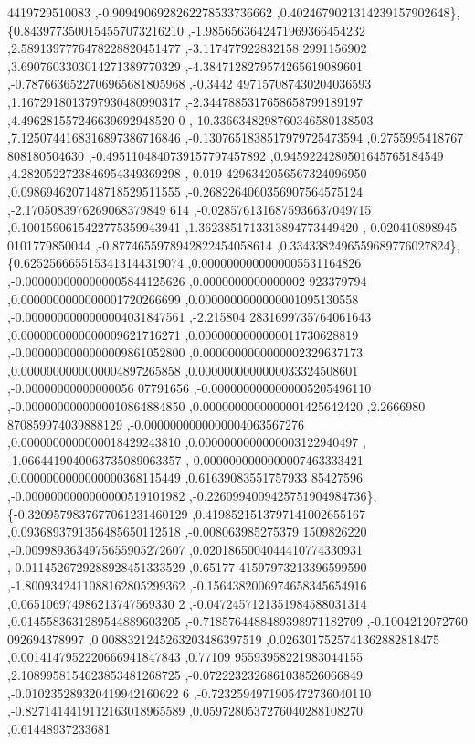 \begin{DoxyCode}
      4419729510083 ,-0.9094906928262278533736662 ,0.4024679021314239157902648\},
\{0.8439773500154557073216210 ,-1.9856563642471969366454232 ,2.5891397776478228820451477 ,-3.117477922832158
      2991156902 ,3.6907603303014271389770329 ,-4.3847128279574265619089601 ,-0.7876636522706965681805968 ,-0.3442
      497157087430204036593 ,1.1672918013797930480990317 ,-2.3447885317658658799189197 ,4.496281557246639692948520
      0 ,-10.3366348298760346580138503 ,7.1250744168316897386716846 ,-0.1307651838517979725473594 ,0.2755995418767
      808180504630 ,-0.4951104840739157797457892 ,0.9459224280501645765184549 ,4.2820522723846954349369298 ,-0.019
      4296342056567324096950 ,0.0986946207148718529511555 ,-0.2682264060356907564575124 ,-2.1705083976269068379849
      614 ,-0.0285761316875936637049715 ,0.1001590615422775359943941 ,1.3623851713313894773449420 ,-0.020410898945
      0101779850044 ,-0.8774655978942822454058614 ,0.3343382496559689776027824\},
\{0.6252566655153413144319074 ,0.0000000000000005531164826 ,-0.0000000000000005844125626 ,0.0000000000000002
      923379794 ,0.0000000000000001720266699 ,0.0000000000000001095130558 ,-0.0000000000000004031847561 ,-2.215804
      2831699735764061643 ,0.0000000000000009621716271 ,0.0000000000000011730628819 ,-0.0000000000000009861052800 
      ,0.0000000000000002329637173 ,0.0000000000000004897265858 ,0.0000000000000033324508601 ,-0.00000000000000056
      07791656 ,-0.0000000000000005205496110 ,-0.0000000000000010864884850 ,0.0000000000000001425642420 ,2.2666980
      870859974039888129 ,-0.0000000000000004063567276 ,0.0000000000000018429243810 ,0.0000000000000003122940497 ,
      -1.0664419040063735089063357 ,-0.0000000000000007463333421 ,0.0000000000000000368115449 ,0.61639083551757933
      85427596 ,-0.0000000000000000519101982 ,-0.2260994009425751904984736\},
\{-0.3209579837677061231460129 ,0.4198521513797141002655167 ,0.0936893791356485650112518 ,-0.008063985275379
      1509826220 ,-0.0099893634975655905272607 ,0.0201865004044410774330931 ,-0.0114526729288928451333529 ,0.65177
      41597973213396599590 ,-1.8009342411088162805299362 ,-0.1564382006974658345654916 ,0.065106974986213747569330
      2 ,-0.0472457121351984588031314 ,0.0145583631289544889603205 ,-0.7185764488489398971182709 ,-0.1004212072760
      092694378997 ,0.0088321245263203486397519 ,0.0263017525741362882818475 ,0.0014147952220666941847843 ,0.77109
      95593958221983044155 ,2.1089958154623853481268725 ,-0.0722232326861038526066849 ,-0.010235289320419942160622
      6 ,-0.7232594971905472736040110 ,-0.8271414419112163018965589 ,0.0597280537276040288108270 ,0.61448937233681

\end{DoxyCode}
